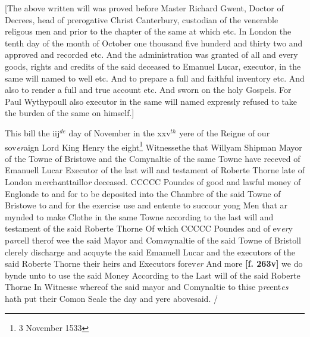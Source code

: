 \documentclass[a4paper,12pt]{article}
\begin{document}
[The above written will was proved before Master Richard Gwent, Doctor of Decrees, head of prerogative Christ Canterbury, custodian of the venerable religous men and prior to the chapter of the same at which etc. In London the tenth day of the month of October one thousand five hunderd and thirty two and approved and recorded etc. And the administration was granted of all and every goods, rights and credits of the said deceased to Emanuel Lucar, executor, in the same will named to well etc. And to prepare a full and faithful inventory etc. And also to render a full and true account etc. And sworn on the holy Gospels. For Paul Wythypoull also executor in the same will named expressly refused to take the burden of the same on himself.]

This bill the iij$^{de}$ day of November in the xxv$^{th}$ yere of the Reigne of our sov\textit{er}aign Lord King Henry the eight\footnote{3 November 1533} Witnessethe that Willyam Shipman Mayor of the Towne of Bristowe and the Comynaltie of the same Towne have receved of Emanuell Lucar Executor of the last will and testament of Roberte Thorne late of London m\textit{er}ch\textit{a}nttaillo\textit{r} deceased. CCCCC Poundes of good and lawful money of Englonde to and for to be deposited into the Chambre of the said Towne of Bristowe to and for the exercise use and entente to succour yong Men that ar mynded to make Clothe in the same Towne according to the last will and testament of the said Roberte Thorne Of which CCCCC Poundes and of ev\textit{er}y p\textit{ar}cell therof wee the said Mayor and Com\textit{m}ynaltie of the said Towne of Bristoll clerely discharge and acquyte the said Emanuell Lucar and the executors of the said Roberte Thorne their heirs and Executors forev\textit{er} And more \textbf{[f. 263v]} we do bynde unto to use the said Money According to the Last will of the said Roberte Thorne In Witnesse whereof the said mayor and Comynaltie to thise p\textit{re}ent\textit{es} hath put their Comon Seale the day and yere abovesaid. /
\end{document}
